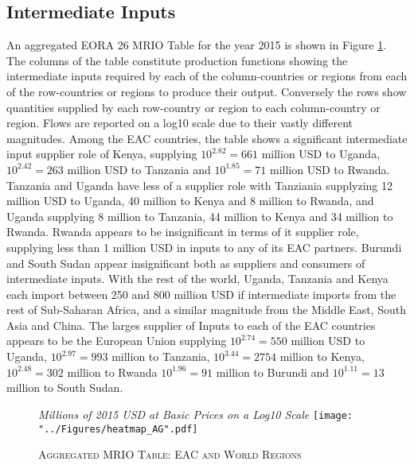 \documentclass[a4paper]{article}
\begin{document}
\subsection{Intermediate Inputs}
An aggregated EORA 26 MRIO Table for the year 2015 is shown in Figure \ref{fig:wld}.  The columns of the table constitute production functions showing the intermediate inputs required by each of the column-countries or regions from each of the row-countries or regions to produce their output. Conversely the rows show quantities supplied by each row-country or region to each column-country or region. Flows are reported on a log10 scale due to their vastly different magnitudes. Among the EAC countries, the table shows a significant intermediate input supplier role of Kenya, supplying $10^{2.82} = 661$ million USD to Uganda, $10^{2.42} = 263$ million USD to Tanzania and  $10^{1.85} = 71$ million USD to Rwanda. Tanzania and Uganda have less of a supplier role with Tanziania supplyzing 12 million USD to Uganda, 40 million to Kenya and 8 million to Rwanda, and Uganda supplying 8 million to Tanzania, 44 million to Kenya and 34 million to Rwanda. Rwanda appears to be insignificant in terms of it supplier role, supplying less than 1 million USD in inputs to any of its EAC partners. Burundi and South Sudan appear insignificant both as suppliers and consumers of intermediate inputs. With the rest of the world, Uganda, Tanzania and Kenya each import between 250 and 800 million USD if intermediate imports from the rest of Sub-Saharan Africa, and a similar magnitude from the Middle East, South Asia and China. The larges supplier of Inputs to each of the EAC countries appears to be the European Union supplying $10^{2.74} = 550$ million USD to Uganda, $10^{2.97} = 993$ million to Tanzania, $10^{3.44} = 2754$ million to Kenya, $10^{2.48} = 302$ million to Rwanda  $10^{1.96} = 91$ million to Burundi and $10^{1.11} = 13$ million to South Sudan. 

\begin{figure}[h!]
\centering
\caption{\label{fig:wld}\textsc{Aggregated MRIO Table: EAC and World Regions}}
\small{\textit{Millions of 2015 USD at Basic Prices on a Log10 Scale}}
\texttt{[image: "../Figures/heatmap\_AG".pdf]} %
\end{figure}
\FloatBarrier
\end{document}
